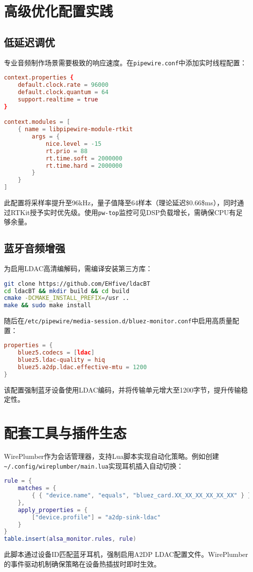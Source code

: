 \chapter{高级优化配置实践}
\section{低延迟调优}
专业音频制作场景需要极致的响应速度。在\verb!pipewire.conf!中添加实时线程配置：\par
\begin{lstlisting}[language=conf]
context.properties {
    default.clock.rate = 96000
    default.clock.quantum = 64
    support.realtime = true
}

context.modules = [
    { name = libpipewire-module-rtkit
        args = {
            nice.level = -15
            rt.prio = 88
            rt.time.soft = 2000000
            rt.time.hard = 2000000
        }
    }
]
\end{lstlisting}
此配置将采样率提升至96kHz，量子值降至64样本（理论延迟\${}0.66\${}ms），同时通过RTKit授予实时优先级。使用\verb!pw-top!监控可见DSP负载增长，需确保CPU有足够余量。\par
\section{蓝牙音频增强}
为启用LDAC高清编解码，需编译安装第三方库：\par
\begin{lstlisting}[language=bash]
git clone https://github.com/EHfive/ldacBT
cd ldacBT && mkdir build && cd build
cmake -DCMAKE_INSTALL_PREFIX=/usr ..
make && sudo make install
\end{lstlisting}
随后在\verb!/etc/pipewire/media-session.d/bluez-monitor.conf!中启用高质量配置：\par
\begin{lstlisting}[language=conf]
properties = {
    bluez5.codecs = [ldac]
    bluez5.ldac-quality = hiq
    bluez5.a2dp.ldac.effective-mtu = 1200
}
\end{lstlisting}
该配置强制蓝牙设备使用LDAC编码，并将传输单元增大至1200字节，提升传输稳定性。\par
\chapter{配套工具与插件生态}
WirePlumber作为会话管理器，支持Lua脚本实现自动化策略。例如创建\verb!~/.config/wireplumber/main.lua!实现耳机插入自动切换：\par
\begin{lstlisting}[language=lua]
rule = {
    matches = {
        { { "device.name", "equals", "bluez_card.XX_XX_XX_XX_XX_XX" } }
    },
    apply_properties = {
        ["device.profile"] = "a2dp-sink-ldac"
    }
}
table.insert(alsa_monitor.rules, rule)
\end{lstlisting}
此脚本通过设备ID匹配蓝牙耳机，强制启用A2DP LDAC配置文件。WirePlumber的事件驱动机制确保策略在设备热插拔时即时生效。\par
